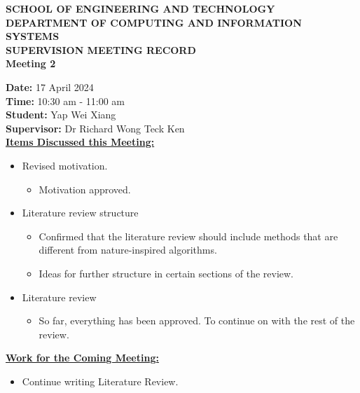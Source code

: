 \documentclass[a4paper, 12pt]{report}
\begin{document}
	
	\onehalfspacing
	
	\begin{center}
		
		\textbf{\large SCHOOL OF ENGINEERING AND TECHNOLOGY}	\\
		\textbf{\small DEPARTMENT OF COMPUTING AND INFORMATION SYSTEMS} \\
		\vspace{1cm}
		\textbf{\LARGE SUPERVISION MEETING RECORD}\\
		\textbf{\normalsize Meeting 2}	%
		
	\end{center}
	
	\noindent			%
	\textbf{Date: } 17 April 2024 \\	%
	\textbf{Time: } 10:30 am - 11:00 am \\	%
	\textbf{Student: } Yap Wei Xiang \\
	\textbf{Supervisor: } Dr Richard Wong Teck Ken \\
	
	\noindent			%
	\textbf{\underline{Items Discussed this Meeting: }}
	\begin{itemize}	%
		\item Revised motivation.
		\begin{itemize}
			\item Motivation approved.
		\end{itemize}
		
		\item Literature review structure
		\begin{itemize}
			\item Confirmed that the literature review should include methods that are different from nature-inspired algorithms.
			\item Ideas for further structure in certain sections of the review.
		\end{itemize}
		
		\item Literature review
		\begin{itemize}
			\item So far, everything has been approved. To continue on with the rest of the review.
		\end{itemize}
		
	\end{itemize}
	
	\noindent			%
	\textbf{\underline{Work for the Coming Meeting: }}
	\begin{itemize}	%
		\item Continue writing Literature Review.
	\end{itemize}
	
\end{document}
